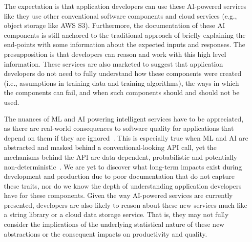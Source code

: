 The expectation is that application developers can use these AI-powered services like they use other conventional software components and cloud services (e.g., object storage like AWS S3). Furthermore, the documentation of these AI components is still anchored to the traditional approach of briefly explaining the end-points with some information about the expected inputs and responses. The presupposition is that developers can reason and work with this high level information. These services are also marketed to suggest that application developers do not need to fully understand how these components were created (i.e., assumptions in training data and training algorithms), the ways in which the components can fail, and when such components should and should not be used.

The nuances of ML and AI powering intelligent services have to be appreciated, as there are real-world consequences to software quality for applications that depend on them if they are ignored~\citep{Cummaudo:2019icsme}. This is especially true when ML and AI are abstracted and masked behind a conventional-looking API call, yet the mechanisms behind the API are data-dependent, probabilistic and potentially non-deterministic~\citep{Ohtake:2019vi}. We are yet to discover what long-term impacts exist during development and production due to poor documentation that do not capture these traits, nor do we know the depth of understanding application developers have for these components. Given the way AI-powered services are currently presented, developers are also likely to reason about these new services much like a string library or a cloud data storage service. That is, they may not fully consider the implications of the underlying statistical nature of these new abstractions or the consequent impacts on productivity and quality.

